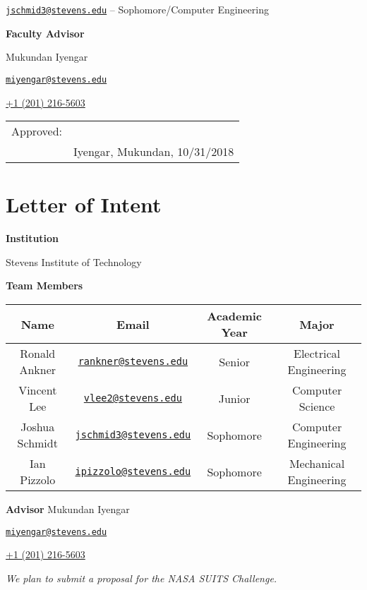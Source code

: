 \documentclass{article}
\let\Oldsection\section
\renewcommand{\section}{\FloatBarrier\Oldsection}
\begin{document}
\begin{center}
\href{mailto:jschmid3@stevens.edu}{\nolinkurl{jschmid3@stevens.edu}} -- Sophomore/Computer Engineering

\bigskip
\bigskip

\textbf{Faculty Advisor}

Mukundan Iyengar

\href{mailto:miyengar@stevens.edu}{\nolinkurl{miyengar@stevens.edu}}

\href{tel:12012165603}{+1 (201) 216-5603}

\bigskip
\bigskip
\bigskip
\bigskip
\bigskip
\bigskip
\bigskip
\bigskip
\bigskip
\bigskip
\bigskip

\begin{tabular}{@{}p{.5in}p{3.5in}@{}}
Approved: & \hrulefill \\
& Iyengar, Mukundan, 10/31/2018\\
\end{tabular}

\end{center}

\newpage

\section{Letter of Intent}

\begin{center}

\bigskip
\bigskip
\textbf{Institution}

Stevens Institute of Technology

\bigskip

\textbf{Team Members}

\bigskip
\bigskip

\begin{tabular}{||c c c c||} 
 \hline
 Name & Email & Academic Year & Major \\ [0.5ex] 
 \hline\hline
 Ronald Ankner & \href{mailto:rankner@stevens.edu}{\nolinkurl{rankner@stevens.edu}} & Senior & Electrical Engineering \\ 
 \hline
 Vincent Lee & \href{mailto:vlee2@stevens.edu}{\nolinkurl{vlee2@stevens.edu}} & Junior & Computer Science \\
 \hline
 Joshua Schmidt & \href{mailto:jschmid3@stevens.edu}{\nolinkurl{jschmid3@stevens.edu}} & Sophomore & Computer Engineering \\
 \hline
 Ian Pizzolo & \href{mailto:ipizzolo@stevens.edu}{\nolinkurl{ipizzolo@stevens.edu}} & Sophomore & Mechanical Engineering \\
 \hline
\end{tabular}

\bigskip
\bigskip

\textbf{Advisor}
\bigskip
Mukundan Iyengar

\href{mailto:miyengar@stevens.edu}{\nolinkurl{miyengar@stevens.edu}}

\href{tel:12012165603}{+1 (201) 216-5603}

\bigskip
\bigskip
\textit{We plan to submit a proposal for the NASA SUITS Challenge.}

\end{center}
\end{document}

